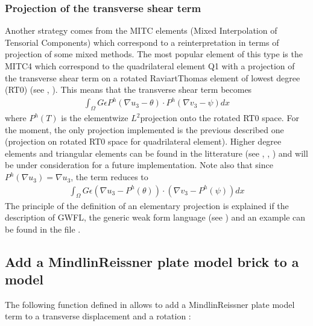 \documentclass[a4paper,11pt,english]{sphinxmanual}
\begin{document}
\subsubsection{Projection of the transverse shear term}
\label{\detokenize{userdoc/model_Mindlin_plate:projection-of-the-transverse-shear-term}}
Another strategy comes from the MITC elements (Mixed Interpolation of Tensorial Components) which correspond to a re\sphinxhyphen{}interpretation in terms of projection of some mixed methods. The most popular element of this type is the MITC4 which correspond to the quadrilateral element Q1 with a projection of the transverse shear term on a rotated Raviart\sphinxhyphen{}Thomas element of lowest degree (RT0) (see , ). This means that the transverse shear term becomes
\begin{equation*}
\begin{split}\int_{\Omega}G\epsilon P^h(\nabla u_3 - \theta)\cdot P^h(\nabla v_3 - \psi)dx\end{split}
\end{equation*}
where \(P^h(T)\) is the elementwize \(L^2\)\sphinxhyphen{}projection onto the rotated RT0 space.  For the moment, the only projection implemented is the previous described one (projection on rotated RT0 space for quadrilateral element). Higher degree elements and triangular elements can be found in the litterature (see , , ) and will be under consideration for a future implementation. Note also that since \(P^h(\nabla u_3) = \nabla u_3\), the term reduces to
\begin{equation*}
\begin{split}\int_{\Omega}G\epsilon (\nabla u_3 - P^h(\theta))\cdot(\nabla v_3 - P^h(\psi))dx\end{split}
\end{equation*}
The principle of the definition of an elementary projection is explained if the description of GWFL, the generic weak form language (see {\hyperref[\detokenize{userdoc/gasm_high:ud-gasm-high-elem-trans}]{}}) and an example can be found in the file .


\subsection{Add a Mindlin\sphinxhyphen{}Reissner plate model brick to a model}
\label{\detokenize{userdoc/model_Mindlin_plate:add-a-mindlin-reissner-plate-model-brick-to-a-model}}
The following function defined in  allows to add a Mindlin\sphinxhyphen{}Reissner plate model term to a transverse displacement  and a rotation :
\end{document}
